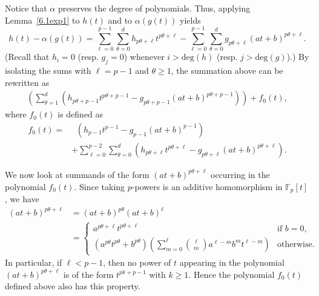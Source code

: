 \documentclass[a4paper,11pt]{amsart}
\makeatletter
\numberwithin{equation}{section}
\theoremstyle{plain}
\theoremstyle{definition}
\renewenvironment{proof}[1][\proofname] {\par\pushQED{\qed}\normalfont\topsep6\p@\@plus6\p@\relax\trivlist\item[\hskip\labelsep\bfseries#1\@addpunct{.}]\ignorespaces}{\popQED\endtrivlist\@endpefalse}
\newcommand{\F}{\mathbb{F}}
\makeatother
\begin{document}
\begin{proof}
Notice that $\alpha$ preserves the degree of polynomials. Thus, applying Lemma~\ref{6.1exp1} to $h(t)$ and to $\alpha(g(t))$ yields
\[h(t)-\alpha(g(t)) = \sum_{\ell = 0}^{p-1} \sum_{\theta=0}^{d} h_{p\theta+\ell}t^{p\theta+\ell} - \sum_{\ell = 0}^{p-1} \sum_{\theta=0}^{d} g_{p\theta+\ell}(at+b)^{p\theta+\ell}. \]
(Recall that $h_i = 0$ (resp. $g_j = 0$) whenever $i > \mathrm{deg}(h)$ (resp. $j > \mathrm{deg}(g)$).) 
By isolating the sums with $\ell = p-1$ and $\theta \geq 1$, the summation above can be rewritten as
\begin{align} \label{supersum}
 \left(\sum_{\theta=1}^{d} (h_{p\theta+p-1}t^{p\theta+p-1}-g_{p\theta+p-1}(at+b)^{p\theta+p-1}) \right) + f_0(t),
\end{align}
where $f_0(t)$ is defined as
\begin{align*}
 f_0(t) =& \phantom{a} (h_{p-1}t^{p-1}-g_{p-1}(at+b)^{p-1}) \\
 &+ \sum_{\ell = 0}^{p-2} \sum_{\theta=0}^{d} (h_{p\theta+\ell}t^{p\theta+\ell} - g_{p\theta+\ell}(at+b)^{p\theta+\ell}).
\end{align*}

We now look at summands of the form $(at+b)^{p\theta+\ell}$ occurring in the polynomial $f_0(t)$. Since taking $p$-powers is an additive homomorphism in $\F_p[t]$, we have
\begin{align*} 
(at+b)^{p\theta+\ell} & = (at+b)^{p\theta}(at+b)^\ell \\
& = \begin{cases} a^{p\theta+\ell}t^{p\theta+\ell} & \text{if } b=0, \\ (a^{p\theta}t^{p\theta}+b^{p\theta}) \left( \sum_{m=0}^\ell \binom{\ell}{m} a^{\ell-m}b^m t^{\ell-m} \right) & \text{otherwise}. \end{cases}
\end{align*}
In particular, if $\ell < p-1$, then no power of $t$ appearing in the polynomial $(at+b)^{p\theta+\ell}$ is of the form $t^{pk+p-1}$ with $k \geq 1$. Hence the polynomial $f_0(t)$ defined above also has this property. 


\end{proof}
\end{document}
